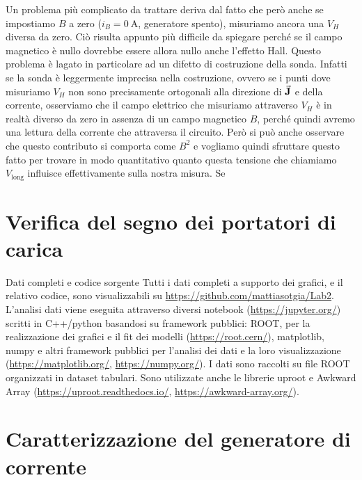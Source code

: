 \documentclass[
    prl,
    reprint, 
    superscriptaddress, 
    altaffilletter, 
    amsmath, 
    amssymb, 
    a4paper,
    varvw]{revtex4-2}
\begin{document}
Un problema più complicato da trattare deriva dal fatto che però anche se impostiamo $B$ a zero ($i_B=\SI{0}{\ampere}$, generatore spento), misuriamo ancora una $V_H$ diversa da zero. Ciò risulta appunto più difficile da spiegare perché se il campo magnetico è nullo dovrebbe essere allora nullo anche l'effetto Hall. Questo problema è lagato in particolare ad un difetto di costruzione della sonda. Infatti se la sonda è leggermente imprecisa nella costruzione, ovvero se i punti dove misuriamo $V_H$ non sono precisamente ortogonali alla direzione di $\va{J}$ e della corrente, osserviamo che il campo elettrico che misuriamo attraverso $V_H$ è in realtà diverso da zero in assenza di un campo magnetico $B$, perché quindi avremo una lettura della corrente che attraversa il circuito. Però si può anche osservare che questo contributo si comporta come $B^2$ e vogliamo quindi sfruttare questo fatto per trovare in modo quantitativo quanto questa tensione che chiamiamo $V_\text{long}$ influisce effettivamente sulla nostra misura. Se 


\section{Verifica del segno dei portatori di carica}


\begin{methods}{D\lowercase{ati completi e codice sorgente}}
    Tutti i dati completi a supporto dei grafici, e il relativo codice, sono visualizzabili su \url{https://github.com/mattiasotgia/Lab2}. L'analisi dati viene eseguita attraverso diversi notebook (\url{https://jupyter.org/}) scritti in C++/python basandosi su framework pubblici: ROOT, per la realizzazione dei grafici e il fit dei modelli (\url{https://root.cern/}), matplotlib, numpy e altri framework pubblici per l'analisi dei dati e la loro visualizzazione (\url{https://matplotlib.org/}, \url{https://numpy.org/}). I dati sono raccolti su file ROOT organizzati in dataset tabulari. Sono utilizzate anche le librerie uproot e Awkward Array (\url{https://uproot.readthedocs.io/}, \url{https://awkward-array.org/}).
\end{methods}


\appendix
\section{Caratterizzazione del generatore di corrente}\label{sec:appendix_current_gen}
\end{document}
